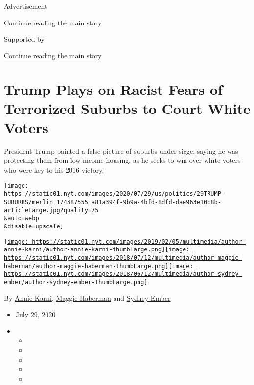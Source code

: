 Advertisement

\protect\hyperlink{after-top}{Continue reading the main story}

Supported by

\protect\hyperlink{after-sponsor}{Continue reading the main story}

\hypertarget{trump-plays-on-racist-fears-of-terrorized-suburbs-to-court-white-voters}{%
\section{Trump Plays on Racist Fears of Terrorized Suburbs to Court
White
Voters}\label{trump-plays-on-racist-fears-of-terrorized-suburbs-to-court-white-voters}}

President Trump painted a false picture of suburbs under siege, saying
he was protecting them from low-income housing, as he seeks to win over
white voters who were key to his 2016 victory.

\texttt{[image: https://static01.nyt.com/images/2020/07/29/us/politics/29TRUMP-SUBURBS/merlin\_174387555\_a81a394f-9b9a-4bfd-8dfd-dae963e10c8b-articleLarge.jpg?quality=75\\\&auto=webp\\\&disable=upscale]}

\href{https://www.nytimes.com/by/annie-karni}{\texttt{[image: https://static01.nyt.com/images/2019/02/05/multimedia/author-annie-karni/author-annie-karni-thumbLarge.png]}}\href{https://www.nytimes.com/by/maggie-haberman}{\texttt{[image: https://static01.nyt.com/images/2018/07/12/multimedia/author-maggie-haberman/author-maggie-haberman-thumbLarge.png]}}\href{https://www.nytimes.com/by/sydney-ember}{\texttt{[image: https://static01.nyt.com/images/2018/06/12/multimedia/author-sydney-ember/author-sydney-ember-thumbLarge.png]}}

By \href{https://www.nytimes.com/by/annie-karni}{Annie Karni},
\href{https://www.nytimes.com/by/maggie-haberman}{Maggie Haberman} and
\href{https://www.nytimes.com/by/sydney-ember}{Sydney Ember}

\begin{itemize}
\item
  July 29, 2020
\item
  \begin{itemize}
  \item
  \item
  \item
  \item
  \item
  \end{itemize}
\end{itemize}

